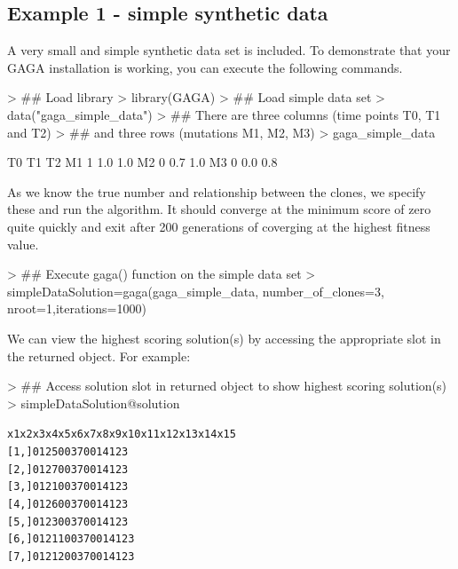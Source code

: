 \documentclass{article}
\begin{document}
\subsection{Example 1 - simple synthetic data}
A very small and simple synthetic data set is included.  To demonstrate that your GAGA installation is working, you can execute the following commands.  
\begin{Schunk}
\begin{Sinput}
> ## Load library
> library(GAGA)
> ## Load simple data set
> data("gaga_simple_data")
> ## There  are three columns (time points T0, T1 and T2)
> ## and three rows (mutations M1, M2, M3)
> gaga_simple_data
\end{Sinput}
\begin{Soutput}
   T0  T1  T2
M1  1 1.0 1.0
M2  0 0.7 1.0
M3  0 0.0 0.8
\end{Soutput}
\end{Schunk}

As we know the true number and relationship between the clones, we specify these and run the algorithm.  It should converge at the minimum score of zero quite quickly and exit after 200 generations of coverging at the highest fitness value.

\begin{Schunk}
\begin{Sinput}
> ## Execute gaga() function on the simple data set
> simpleDataSolution=gaga(gaga_simple_data, number_of_clones=3, nroot=1,iterations=1000)
\end{Sinput}
\end{Schunk}

We can view the highest scoring solution(s) by accessing the appropriate slot in the returned object.  For example:

\begin{Schunk}
\begin{Sinput}
> ## Access solution slot in returned object to show highest scoring solution(s)
> simpleDataSolution@solution
\end{Sinput}
\end{Schunk}
\begin{alltt}
     x1 x2 x3 x4 x5 x6 x7 x8 x9 x10 x11 x12 x13 x14 x15
[1,]  0  1  2  5  0  0  3  7  0   0   1   4   1   2   3
[2,]  0  1  2  7  0  0  3  7  0   0   1   4   1   2   3
[3,]  0  1  2  1  0  0  3  7  0   0   1   4   1   2   3
[4,]  0  1  2  6  0  0  3  7  0   0   1   4   1   2   3
[5,]  0  1  2  3  0  0  3  7  0   0   1   4   1   2   3
[6,]  0  1  2 11  0  0  3  7  0   0   1   4   1   2   3
[7,]  0  1  2 12  0  0  3  7  0   0   1   4   1   2   3
\end{alltt}
\end{document}
